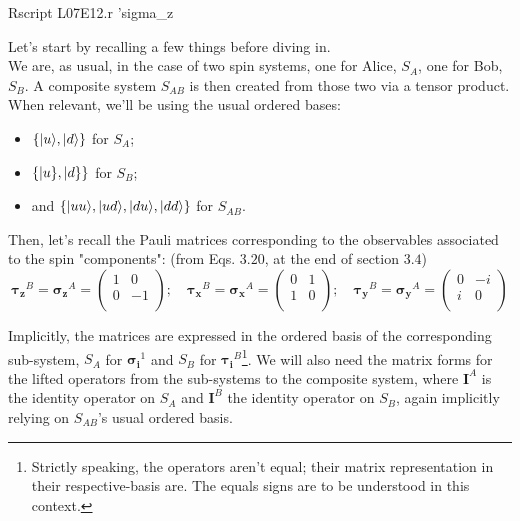 \documentclass[solutions.tex]{subfiles}
\begin{document}
\bash[stdoutFile=L07E12/sigma_z-tau_z-near-singlet.tex]
Rscript L07E12.r 'sigma_z %
\END
\fi

\hr

Let's start by recalling a few things before diving in. \\

We are, as usual, in the case of two spin systems, one for
Alice, $S_A$, one for Bob, $S_B$. A composite system $S_{AB}$
is then created from those two via a tensor product. \\

When relevant, we'll be using the usual ordered bases:
\begin{itemize}
	\item $\{|u\rangle, |d\rangle\}$ for $S_A$;
	\item $\{|u\}, |d\}\}$ for $S_B$;
	\item and $\{ |uu\rangle, |ud\rangle, |du\rangle, |dd\rangle \}$ for $S_{AB}$.
\end{itemize}

Then, let's recall the Pauli matrices corresponding to the
observables associated to the spin "components":
(from Eqs. $3.20$, at the end of section $3.4$)
\[
	\bm{\tau_z}^B = \bm{\sigma_z}^A = \begin{pmatrix}
		1 & 0 \\
		0 & -1 \\
	\end{pmatrix};\quad
	\bm{\tau_x}^B = \bm{\sigma_x}^A = \begin{pmatrix}
		0 & 1 \\
		1 & 0 \\
	\end{pmatrix};\quad
	\bm{\tau_y}^B = \bm{\sigma_y}^A = \begin{pmatrix}
		0 & -i \\
		i & 0 \\
	\end{pmatrix}
\]

Implicitly, the matrices are expressed in the ordered basis
of the corresponding sub-system, $S_A$ for $\bm{\sigma_i}^1$ and
$S_B$ for $\bm{\tau_i}^B$\footnote{Strictly speaking, the operators
aren't equal; their matrix representation in their respective-basis are.
The equals signs are to be understood in this context.}.
We will also need the matrix forms for the lifted operators from the
sub-systems to the composite system, where $\bm{I}^A$ is the identity
operator on $S_A$ and $\bm{I}^B$ the identity operator on $S_B$, again
implicitly relying on $S_{AB}$'s usual ordered basis. \\
\end{document}

